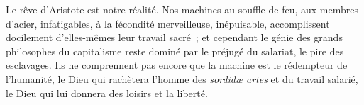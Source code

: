\documentclass[french,twoside]{book} %
\newif\ifdev
\renewcommand{\LettrineFontHook}{\color{rubric}}
\newcommand{\initialiv}[2]{%
  \let\oldLFH\LettrineFontHook
  \IfSubStr{QJ’}{#1}{
    \lettrine[lines=4, lhang=0.2, loversize=-0.1, lraise=0.2]{\smash{#1}}{#2}
  }{\IfSubStr{É}{#1}{
    \lettrine[lines=4, lhang=0.2, loversize=-0, lraise=0]{\smash{#1}}{#2}
  }{\IfSubStr{ÀÂ}{#1}{
    \lettrine[lines=4, lhang=0.2, loversize=-0, lraise=0, slope=0.6em]{\smash{#1}}{#2}
  }{\IfSubStr{A}{#1}{
    \lettrine[lines=4, lhang=0.2, loversize=0.2, slope=0.6em]{\smash{#1}}{#2}
  }{\IfSubStr{V}{#1}{
    \lettrine[lines=4, lhang=0.2, loversize=0.2, slope=-0.5em]{\smash{#1}}{#2}
  }{
    \lettrine[lines=4, lhang=0.2, loversize=0.2]{\smash{#1}}{#2}
  }}}}}
  \let\LettrineFontHook\oldLFH
}
\newcommand\chapterclose{} %
\renewcommand{\LettrineFontHook}{\bfseries\color{rubric}}
\begin{document}
\noindent Le rêve d’Aristote est notre réalité. Nos machines au souffle de feu, aux membres d’acier, infatigables, à la fécondité merveilleuse, inépuisable, accomplissent docilement d’elles-mêmes leur travail sacré ; et cependant le génie des grands philosophes du capitalisme reste dominé par le préjugé du salariat, le pire des esclavages. Ils ne comprennent pas encore que la machine est le rédempteur de l’humanité, le Dieu qui rachètera l’homme des \emph{sordidæ artes} et du travail salarié, le Dieu qui lui donnera des loisirs et la liberté.
\chapterclose

 


\ifbooklet
  \newpage\null\thispagestyle{empty}\newpage
\fi

\ifdev %
\fontname\font — \textsc{Les règles du jeu}\par
(\hyperref[utopie]{\underline{Lien}})\par
\noindent \initialiv{A}{lors là}\blindtext\par
\noindent \initialiv{À}{ la bonheur des dames}\blindtext\par
\noindent \initialiv{É}{tonnez-le}\blindtext\par
\noindent \initialiv{Q}{ualitativement}\blindtext\par
\noindent \initialiv{V}{aloriser}\blindtext\par
\Blindtext
\phantomsection
\label{utopie}
\Blinddocument
\fi
\end{document}

